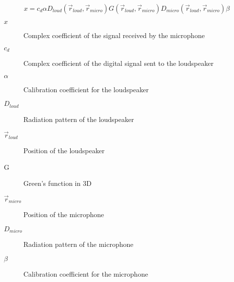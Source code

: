 %

\begin{equation}
x = c_d \alpha D_{loud}(\vec{r}_{loud}, \vec{r}_{micro}) G(\vec{r}_{loud}, \vec{r}_{micro}) D_{micro}(\vec{r}_{loud}, \vec{r}_{micro}) \beta
\label{transEquationCalibration}
\end{equation}

\begin{description}
	\item[$x$] Complex coefficient of the signal received by the microphone
	\item[$c_d$] Complex coefficient of the digital signal sent to the loudspeaker
	\item[$\alpha$] Calibration coefficient for the loudspeaker
	\item[$D_{loud}$] Radiation pattern of the loudspeaker
	\item[$\vec{r}_{loud}$] Position of the loudspeaker
	\item[G] Green's function in 3D
	\item[$\vec{r}_{micro}$] Position of the microphone
	\item[$D_{micro}$] Radiation pattern of the microphone
	\item[$\beta$] Calibration coefficient for the microphone
\end{description}
